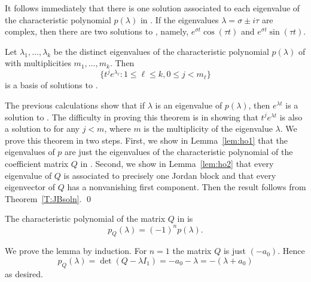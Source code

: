 It follows immediately that there is one solution associated to 
each eigenvalue of the characteristic polynomial $p(\lambda)$ in 
.  If the eigenvalues $\lambda=\sigma\pm i\tau$ are complex, 
then there are two solutions to , namely,
$e^{\sigma t}\cos(\tau t)$ and $e^{\sigma t}\sin(\tau t)$.
\begin{thm} \label{T:hoe}
Let $\lambda_1,\ldots,\lambda_k$ be the distinct eigenvalues of the 
characteristic 
polynomial 
$p(\lambda)$ of  with multiplicities 
$m_1,\ldots,m_k$.  Then 
\[
\{t^je^{\lambda_\ell}: 1\leq\ell\leq k, 0\leq j<m_\ell\}
\]
is a basis of solutions to .
\end{thm} 

\proof  The previous calculations show that if $\lambda$ is an eigenvalue 
of $p(\lambda)$, then $e^{\lambda t}$ is a solution to .  
The difficulty in proving this theorem is in showing that $t^je^{\lambda t}$ 
is also a solution to  for any $j<m$, where $m$ is the 
multiplicity of the eigenvalue $\lambda$.  We prove this theorem in two steps.
First, we show in Lemma~\ref{lem:ho1} that the eigenvalues of $p$ are just the 
eigenvalues of the characteristic polynomial of the coefficient matrix $Q$ in 
.  Second, we show in Lemma~\ref{lem:ho2} that every eigenvalue 
of $Q$ is associated to precisely one Jordan block and that
every eigenvector of $Q$ has a nonvanishing first component. 
Then the result follows from Theorem~\ref{T:JBsoln}.  \qed

\begin{lemma}  \label{lem:ho1}
The characteristic polynomial of 
the matrix $Q$ in  is 
\[
p_Q(\lambda) = (-1)^np(\lambda).
\]
\end{lemma}

\proof We prove the lemma by induction.
For $n=1$ the matrix $Q$ is just $(-a_0)$.  Hence
\[
p_Q(\lambda)=\det(Q-\lambda I_1) = -a_0-\lambda = -(\lambda+a_0)
\]
as desired.


